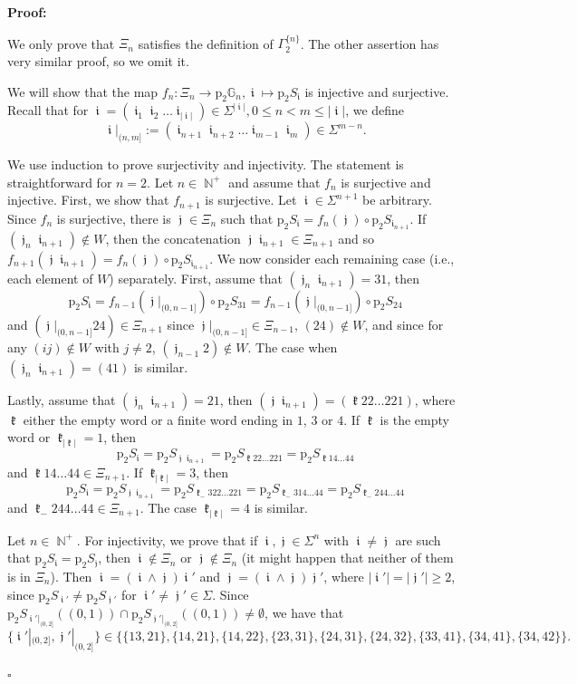 \documentclass[a4paper, 11pt]{article}
\newenvironment{Proof}{\noindent \textbf{Proof:}}{\hfill$\square$\\}
\DeclareMathOperator{\N}{\mathbb{N}}
\DeclareMathOperator{\iii}{\mathfrak{i}}
\DeclareMathOperator{\jjj}{\mathfrak{j}}
\DeclareMathOperator{\kkk}{\mathfrak{k}}
\numberwithin{equation}{section}
\theoremstyle{plain}
\theoremstyle{remark}
\theoremstyle{definition}
\begin{document}
\begin{Proof}

We only prove that $\Xi_n$ satisfies the definition of $\Gamma_2^{\{n\}}$. The other assertion has very similar proof, so we omit it.

We will show that the map $f_n: \Xi_n \longrightarrow \mathrm{p}_2\mathbb{G}_n, \iii \mapsto \mathrm{p}_2S_{\iii}$ is injective and surjective. Recall that for $\iii = (\iii_1 \iii_2 \dots \iii_{|\iii|}) \in \Sigma^{|\iii|}, 0 \leq n < m \leq |\iii|$, we define
\[
\iii|_{(n,m]} := (\iii_{n+1} \iii_{n+2} \dots \iii_{m-1} \iii_m) \in \Sigma^{m-n}.
\]

We use induction to prove surjectivity and injectivity. The statement is straightforward for $n = 2$. Let $n \in \N^+$ and assume that $f_n$ is surjective and injective. First, we show that $f_{n+1}$ is surjective. Let $\iii \in \Sigma^{n+1}$ be arbitrary. Since $f_n$ is surjective, there is $\jjj \in \Xi_n$ such that $\mathrm{p}_2S_{\iii} = f_n(\jjj) \circ \mathrm{p}_2S_{\iii_{n+1}}$. If $(\jjj_n \iii_{n+1}) \notin W$, then the concatenation $\jjj\iii_{n+1}\in\Xi_{n+1}$ and so $f_{n+1}(\jjj\iii_{n+1})=f_n(\jjj)\circ \mathrm{p}_2S_{\iii_{n+1}}$. We now consider each remaining case (i.e., each element of $W$) separately. First, assume that $(\jjj_n \iii_{n+1}) = 31$, then 
\[ \mathrm{p}_2S_{\iii} = f_{n-1}(\jjj|_{(0,n-1]})\circ \mathrm{p}_2S_{31} = f_{n-1}(\jjj|_{(0,n-1]})\circ \mathrm{p}_2S_{24}\]
and $(\jjj|_{(0,n-1]}24) \in \Xi_{n+1}$ since $\jjj|_{(0,n-1]} \in \Xi_{n-1},\, (24) \notin W$, and since for any $(ij) \notin W$ with $j \neq 2$, $(\jjj_{n-1}2) \notin W$. 
The case when $(\jjj_n \iii_{n+1}) = (41)$ is similar.

Lastly, assume that $(\jjj_n \iii_{n+1}) = 21$, then $(\jjj \iii_{n+1}) = (\kkk 22\dots221)$, where $\kkk$ either the empty word or a finite word ending in $1$, $3$ or $4$. If $\kkk$ is the empty word or $\kkk_{|\kkk|}=1$, then
\[ \mathrm{p}_2S_{\iii} = \mathrm{p}_2S_{\jjj \iii_{n+1}} = \mathrm{p}_2S_{\kkk 22\dots221} = \mathrm{p}_2S_{\kkk 14\dots44}\]
and $\kkk 14\dots44 \in \Xi_{n+1}$. If $\kkk_{|\kkk|}=3$, then
\[ \mathrm{p}_2S_{\iii} = \mathrm{p}_2S_{\jjj \iii_{n+1}} = \mathrm{p}_2S_{\kkk_- 322\dots221} = \mathrm{p}_2S_{\kkk_- 314\dots44}=\mathrm{p}_2S_{\kkk_- 244\dots44}\]
and $\kkk_- 244\dots44 \in \Xi_{n+1}$. The case $\kkk_{|\kkk|}=4$ is similar.

Let $n \in \N^+$. For injectivity, we prove that if $\iii,\jjj \in \Sigma^n$ with $\iii \neq \jjj$ are such that $\mathrm{p}_2S_{\iii} = \mathrm{p}_2S_{\jjj}$, then $\iii \notin \Xi_n$ or $\jjj \notin \Xi_n$ (it might happen that neither of them is in $\Xi_n$). Then $\iii = (\iii \wedge \jjj) \iii'$ and $\jjj = (\iii \wedge \jjj) \jjj'$, where $|\iii'| = |\jjj'| \geq 2$, since $\mathrm{p}_2S_{\iii'} \neq \mathrm{p}_2S_{\jjj'}$ for $\iii' \neq \jjj' \in \Sigma$.
Since $\mathrm{p}_2 S_{\iii'|_{(0,2]}}((0,1)) \cap \mathrm{p}_2 S_{\jjj'|_{(0,2]}}((0,1)) \neq \emptyset$, we have that
\[ \{\iii'|_{(0,2]}, \jjj'|_{(0,2]} \} \in \big\{ \{13,21\}, \{14, 21\}, \{14,22\}, \{23,31\}, \{24, 31\}, \{24,32\}, \{33,41\}, \{34, 41\}, \{34,42\} \big\}. \]


\end{Proof}
\end{document}
